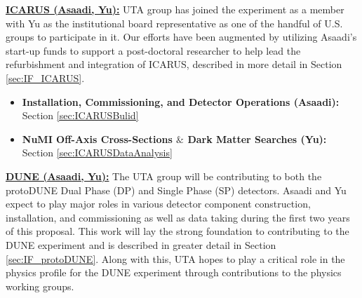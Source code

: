 \noindent \underline{\textbf{ICARUS (Asaadi, Yu):}} UTA group has joined the experiment as a member with Yu as the institutional board representative as one of the handful of U.S. groups to participate in it. Our efforts have been augmented by utilizing Asaadi's start-up funds to support a post-doctoral researcher to help lead the refurbishment and integration of ICARUS, described in more detail in Section \ref{sec:IF_ICARUS}.

\begin{itemize}
\item{\textbf{Installation, Commissioning, and Detector Operations (Asaadi):}} Section \ref{sec:ICARUSBulid}

\item{\textbf{NuMI Off-Axis Cross-Sections $\&$ Dark Matter Searches (Yu):}} Section \ref{sec:ICARUSDataAnalysis}

\end{itemize}


\noindent \textbf{\underline{DUNE (Asaadi, Yu):}} The UTA group will be contributing to both the protoDUNE Dual Phase (DP) and Single Phase (SP) detectors. Asaadi and Yu expect to play major roles in various detector component construction, installation, and commissioning as well as data taking during the first two years of this proposal. This work will lay the strong foundation to contributing to the DUNE experiment and is described in greater detail in Section \ref{sec:IF_protoDUNE}. Along with this, UTA hopes to play a critical role in the physics profile for the DUNE experiment through contributions to the physics working groups.

